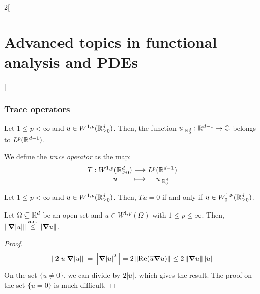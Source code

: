 \documentclass[../../../main_math.tex]{subfiles}
\begin{document}
\begin{multicols}{2}[\section{Advanced topics in functional analysis and PDEs}]
  \subsubsection{Trace operators}
  \begin{theorem}
    Let $1\leq p<\infty$ and $u\in W^{1,p}(\mathbb{R}_{\geq 0}^d)$. Then, the function $u|_{\mathbb{R}_0^d}:\mathbb{R}^{d-1}\to\mathbb{C}$ belongs to $L^p(\mathbb{R}^{d-1})$.
  \end{theorem}
  \begin{definition}
    We define the \emph{trace operator} as the map:
    \begin{align*}
      \function{T}{W^{1,p}(\RR_{\geq 0}^d)}{L^p(\RR^{d-1})}{u}{u|_{\RR_0^d}}
    \end{align*}
  \end{definition}
  \begin{theorem}
    Let $1\leq p<\infty$ and $u\in W^{1,p}(\mathbb{R}_{\geq 0}^d)$. Then, $Tu=0$ if and only if $u\in W_0^{1,p}(\mathbb{R}_{\geq 0}^d)$.
  \end{theorem}
  \begin{lemma}
    Let $\Omega\subseteq \mathbb{R}^d$ be an open set and $u\in W^{1,p}(\Omega)$ with $1\leq p\leq \infty$. Then, $\left\|\grad \abs{u}\right\|\overset{\text{a.e.}}{\leq}\left\|\grad u\right\|$.
  \end{lemma}
  \begin{proof}
    $$
      \left\|2\abs{u}\grad\abs{u}\right\|=\left\|\grad \abs{u}^2\right\|=2\left\|\Re(\overline{u}\grad u)\right\|\leq 2\left\|\grad u\right\|\abs{u}
    $$
    On the set $\{u\ne 0\}$, we can divide by $2\abs{u}$, which gives the result. The proof on the set $\{u=0\}$ is much difficult.
  \end{proof}
\end{multicols}
\end{document}
